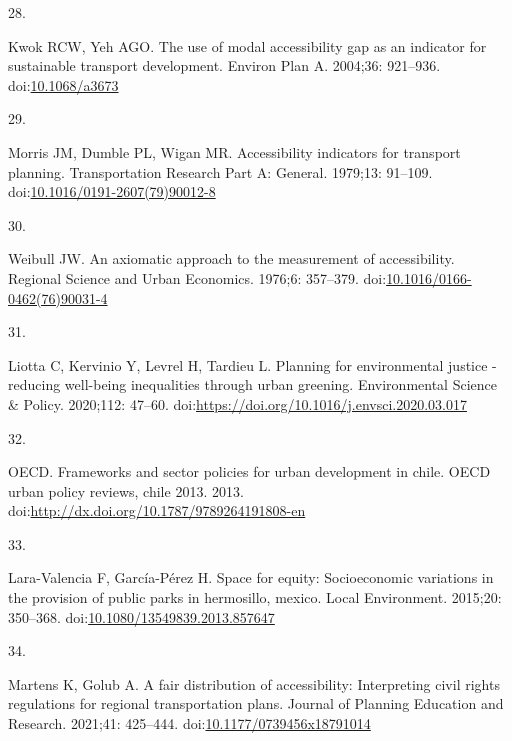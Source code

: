 \documentclass[10pt,letterpaper]{article}
\newlength{\cslhangindent}
\newlength{\csllabelwidth}
\newlength{\cslentryspacingunit} %
\newenvironment{CSLReferences}[2] %
 {%
  \setlength{\parindent}{0pt}
  \ifodd #1
  \let\oldpar\par
  \def\par{\hangindent=\cslhangindent\oldpar}
  \fi
  \setlength{\parskip}{#2\cslentryspacingunit}
 }%
 {}
\newcommand{\CSLLeftMargin}[1]{\parbox[t]{\csllabelwidth}{#1}}
\newcommand{\CSLRightInline}[1]{\parbox[t]{\linewidth - \csllabelwidth}{#1}\break}
\begin{document}
\begin{CSLReferences}{0}{0}
\leavevmode{}%
\CSLLeftMargin{28. }%
\CSLRightInline{Kwok RCW, Yeh AGO. The use of modal accessibility gap as
an indicator for sustainable transport development. Environ Plan A.
2004;36: 921--936.
doi:\href{https://doi.org/10.1068/a3673}{10.1068/a3673}}

\leavevmode{}%
\CSLLeftMargin{29. }%
\CSLRightInline{Morris JM, Dumble PL, Wigan MR. Accessibility indicators
for transport planning. Transportation Research Part A: General.
1979;13: 91--109.
doi:\href{https://doi.org/10.1016/0191-2607(79)90012-8}{10.1016/0191-2607(79)90012-8}}

\leavevmode{}%
\CSLLeftMargin{30. }%
\CSLRightInline{Weibull JW. An axiomatic approach to the measurement of
accessibility. Regional Science and Urban Economics. 1976;6: 357--379.
doi:\href{https://doi.org/10.1016/0166-0462(76)90031-4}{10.1016/0166-0462(76)90031-4}}

\leavevmode{}%
\CSLLeftMargin{31. }%
\CSLRightInline{Liotta C, Kervinio Y, Levrel H, Tardieu L. Planning for
environmental justice - reducing well-being inequalities through urban
greening. Environmental Science \& Policy. 2020;112: 47--60.
doi:\url{https://doi.org/10.1016/j.envsci.2020.03.017}}

\leavevmode{}%
\CSLLeftMargin{32. }%
\CSLRightInline{OECD. Frameworks and sector policies for urban
development in chile. OECD urban policy reviews, chile 2013. 2013.
doi:\url{http://dx.doi.org/10.1787/9789264191808-en}}

\leavevmode{}%
\CSLLeftMargin{33. }%
\CSLRightInline{Lara-Valencia F, García-Pérez H. Space for equity:
Socioeconomic variations in the provision of public parks in hermosillo,
mexico. Local Environment. 2015;20: 350--368.
doi:\href{https://doi.org/10.1080/13549839.2013.857647}{10.1080/13549839.2013.857647}}

\leavevmode{}%
\CSLLeftMargin{34. }%
\CSLRightInline{Martens K, Golub A. A fair distribution of
accessibility: Interpreting civil rights regulations for regional
transportation plans. Journal of Planning Education and Research.
2021;41: 425--444.
doi:\href{https://doi.org/10.1177/0739456x18791014}{10.1177/0739456x18791014}}


\end{CSLReferences}
\end{document}

